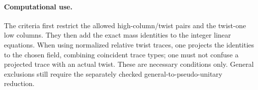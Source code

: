 \paragraph{Computational use.}
The criteria first restrict the allowed high-column/twist pairs and the
twist-one low columns. They then add the exact mass identities to the
integer linear equations. When using normalized relative twist traces,
one projects the identities to the chosen field, combining coincident
trace types; one must not confuse a projected trace with an actual twist.
These are necessary conditions only. General exclusions still require the
separately checked general-to-pseudo-unitary reduction.
